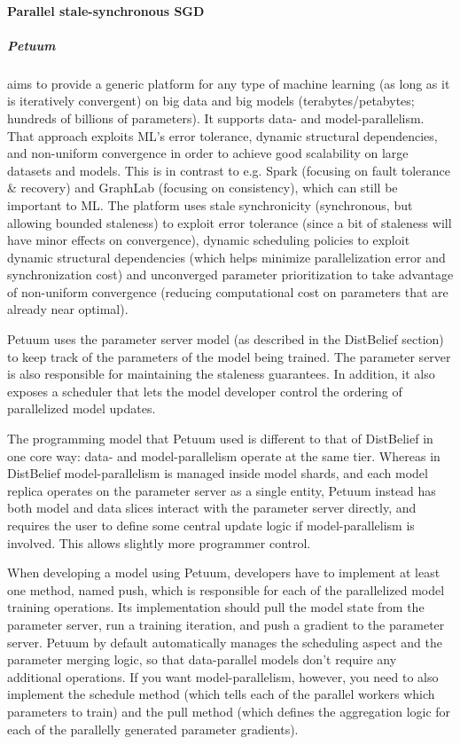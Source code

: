 \paragraph{Parallel stale-synchronous SGD}

\subparagraph{Petuum \citep{Xing2013}}

aims to provide a generic platform for any type of machine learning (as long as it is iteratively convergent) on big data and big models (terabytes/petabytes; hundreds of billions of parameters). It supports data- and model-parallelism. That approach exploits ML’s error tolerance, dynamic structural dependencies, and non-uniform convergence in order to achieve good scalability on large datasets and models. This is in contrast to e.g. Spark (focusing on fault tolerance \& recovery) and GraphLab (focusing on consistency), which can still be important to ML. The platform uses stale synchronicity (synchronous, but allowing bounded staleness) to exploit error tolerance (since a bit of staleness will have minor effects on convergence), dynamic scheduling policies to exploit dynamic structural dependencies (which helps minimize parallelization error and synchronization cost) and unconverged parameter prioritization to take advantage of non-uniform convergence (reducing computational cost on parameters that are already near optimal). 

Petuum uses the parameter server model (as described in the DistBelief section) to keep track of the parameters of the model being trained. The parameter server is also responsible for maintaining the staleness guarantees. In addition, it also exposes a scheduler that lets the model developer control the ordering of parallelized model updates.

The programming model that Petuum used is different to that of DistBelief in one core way: data- and model-parallelism operate at the same tier. Whereas in DistBelief model-parallelism is managed inside model shards, and each model replica operates on the parameter server as a single entity, Petuum instead has both model and data slices interact with the parameter server directly, and requires the user to define some central update logic if model-parallelism is involved. This allows slightly more programmer control.

When developing a model using Petuum, developers have to implement at least one method, named push, which is responsible for each of the parallelized model training operations. Its implementation should pull the model state from the parameter server, run a training iteration, and push a gradient to the parameter server. Petuum by default automatically manages the scheduling aspect and the parameter merging logic, so that data-parallel models don’t require any additional operations. If you want model-parallelism, however, you need to also implement the schedule method (which tells each of the parallel workers which parameters to train) and the pull method (which defines the aggregation logic for each of the parallelly generated parameter gradients).


